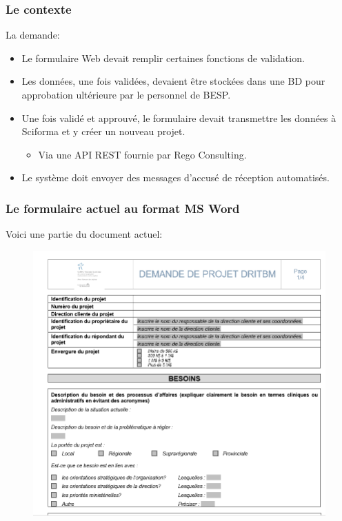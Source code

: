 \documentclass[aspectratio=169]{beamer}%
\let\note\relax
\begin{document}
\begin{frame}
\transglitter
\frametitle{Le contexte}
La demande:	
\begin{itemize}%
	\item Le formulaire Web devait remplir certaines fonctions de validation.\pause
	\item Les données, une fois validées, devaient être stockées dans une BD pour approbation ultérieure par le personnel de BESP.\pause
	\item Une fois validé et approuvé, le formulaire devait transmettre les données à Sciforma et y créer un nouveau projet.\pause
	\begin{itemize}
		\item Via une API REST fournie par Rego Consulting.\pause
	\end{itemize}
	\item Le système doit envoyer des messages d'accusé de réception automatisés.\pause
\end{itemize}

\end{frame}


\begin{frame}
\transwipe 
\frametitle{Le formulaire actuel au format MS Word}
Voici une partie du document actuel:
\begin{figure}
\includegraphics[scale=0.25]{oldForm}
\end{figure}
\end{frame}
\end{document}
